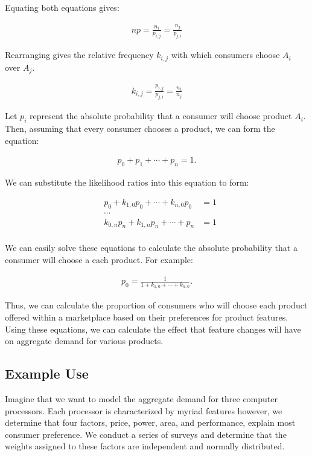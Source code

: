 \documentclass[]{article}
\begin{document}
Equating both equations gives:

\begin{align*}
np = \frac{n_i}{p_{i,j}} = \frac{n_j}{p_{j,i}}
\end{align*}

Rearranging gives the relative frequency \(k_{i,j}\) with which
consumers choose \(A_i\) over \(A_j\).

\begin{align*}
k_{i,j} = \frac{p_{i,j}}{p_{j,i}} = \frac{n_i}{n_j}
\end{align*}

Let \(p_i\) represent the absolute probability that a consumer will
choose product \(A_i\). Then, assuming that every consumer chooses a
product, we can form the equation:

\begin{align*}
p_0 + p_1 + \cdots + p_n = 1.
\end{align*}

We can substitute the likelihood ratios into this equation to form:

\begin{align*}
& p_0 + k_{1,0} p_0 + \cdots + k_{n,0} p_0 &= 1\\
& \cdots\\
& k_{0,n} p_n + k_{1,n} p_n + \cdots + p_n &= 1\\
\end{align*}

We can easily solve these equations to calculate the absolute
probability that a consumer will choose a each product. For example:

\begin{align*}
p_0 = \frac{1}{1 + k_{1,0} + \cdots + k_{n,0}}.
\end{align*}

Thus, we can calculate the proportion of consumers who will choose each
product offered within a marketplace based on their preferences for
product features. Using these equations, we can calculate the effect
that feature changes will have on aggregate demand for various products.
\pagebreak
\hypertarget{example-use}{%
\subsection{Example Use}\label{example-use}}

Imagine that we want to model the aggregate demand for three computer
processors. Each processor is characterized by myriad features however,
we determine that four factors, price, power, area, and performance,
explain most consumer preference. We conduct a series of surveys and
determine that the weights assigned to these factors are independent and
normally distributed.
\end{document}
